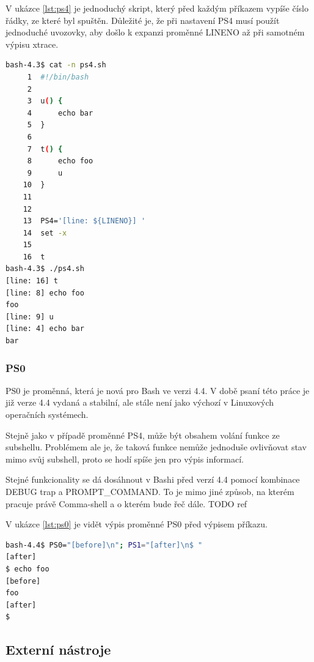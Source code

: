 \documentclass[thesis=M,czech]{FITthesis}[2012/06/26]
\begin{document}
V ukázce \ref{lst:ps4} je jednoduchý skript, který před každým příkazem vypíše číslo řádky, ze které byl spuštěn. Důležité je, že při nastavení PS4 musí použít jednoduché uvozovky, aby došlo k expanzi proměnné LINENO až při samotném výpisu xtrace.

\begin{minipage}{\linewidth}
\begin{lstlisting}[language=bash, caption={ps4}, label={lst:ps4}]
bash-4.3$ cat -n ps4.sh 
     1	#!/bin/bash
     2	
     3	u() {
     4		echo bar
     5	}
     6	
     7	t() {
     8		echo foo
     9		u
    10	}
    11	
    12	
    13	PS4='[line: ${LINENO}] '
    14	set -x
    15	
    16	t
bash-4.3$ ./ps4.sh 
[line: 16] t
[line: 8] echo foo
foo
[line: 9] u
[line: 4] echo bar
bar
\end{lstlisting}
\end{minipage}

%
%
%
\subsubsection{PS0}

PS0 je proměnná, která je nová pro Bash ve verzi 4.4. V době psaní této práce je již verze 4.4 vydaná a stabilní, ale stále není jako výchozí v Linuxových operačních systémech.

Stejně jako v případě proměnné PS4, může být obsahem volání funkce ze subshellu. Problémem ale je, že taková funkce nemůže jednoduše ovlivňovat stav mimo svůj subshell, proto se hodí spíše jen pro výpis informací.

Stejné funkcionality se dá dosáhnout v Bashi před verzí 4.4 pomocí kombinace DEBUG trap a PROMPT\_COMMAND. To je mimo jiné způsob, na kterém pracuje právě Comma-shell a o kterém bude řeč dále. TODO ref

V ukázce \ref{lst:ps0} je vidět výpis proměnné PS0 před výpisem příkazu.

\begin{lstlisting}[language=bash, caption={ps0}, label={lst:ps0}]
bash-4.4$ PS0="[before]\n"; PS1="[after]\n$ "
[after]
$ echo foo
[before]
foo
[after]
$ 
\end{lstlisting}




\subsection{Externí nástroje}
\end{document}
